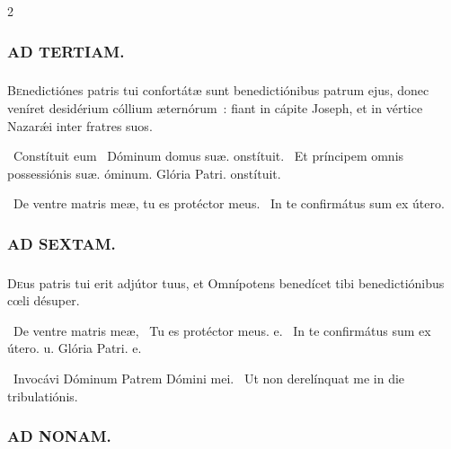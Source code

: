 \documentclass[9pt,twoside]{extarticle}
\begin{document}
\begin{multicols}{2}
{\begin{tightlist}{}
\item {}
\end{tightlist}

\subsubsection*{\center \textsc{AD TERTIAM.}}
\subsubsection*{}
\lettrine{B}enedictiónes patris tui confortátæ sunt benedictiónibus patrum ejus, donec veníret desidérium cóllium æternórum~: fiant in cápite Joseph, et in vértice Nazarǽi inter fratres suos.

\begin{tightlist}{}
\item {}~Constítuit eum \textred{*}~Dóminum domus suæ. onstítuit. ~Et príncipem omnis possessiónis suæ. óminum. Glória Patri. onstítuit.
\item {}~De ventre matris meæ, tu es protéctor meus. ~In te confirmátus sum ex útero.
\end{tightlist}

\subsubsection*{\center \textsc{AD SEXTAM.}}
\subsubsection*{}
\lettrine{D}eus patris tui erit adjútor tuus, et Omnípotens benedícet tibi benedictiónibus cœli désuper.

\begin{tightlist}{}
\item {}~De ventre matris meæ, \textred{*}~Tu es protéctor meus. e. ~In te confirmátus sum ex útero. u. Glória Patri. e.
\item {}~Invocávi Dóminum Patrem Dómini mei. ~Ut non derelínquat me in die tribulatiónis.
\end{tightlist}

\subsubsection*{\center \textsc{AD NONAM.}}
}
\end{multicols}
\end{document}
